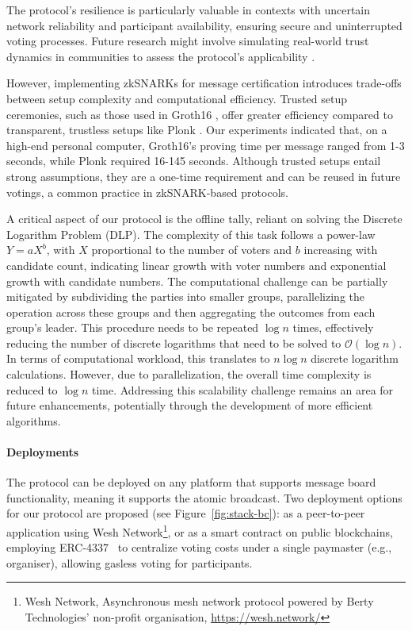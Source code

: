 \documentclass[runningheads]{llncs}
\begin{document}
The protocol's resilience is particularly valuable in contexts with uncertain network reliability and participant availability, ensuring secure and uninterrupted voting processes. Future research might involve simulating real-world trust dynamics in communities to assess the protocol's applicability \cite{healdMathematicalDescriptionTrust2019}.

However, implementing zkSNARKs for message certification introduces trade-offs between setup complexity and computational efficiency. Trusted setup ceremonies, such as those used in Groth16 \cite{grothSizePairingbasedNoninteractive2016}, offer greater efficiency compared to transparent, trustless setups like Plonk \cite{gabizonPlonkPermutationsLagrangebases2019a}. Our experiments indicated that, on a high-end personal computer, Groth16's proving time per message ranged from 1-3 seconds, while Plonk required 16-145 seconds. Although trusted setups entail strong assumptions, they are a one-time requirement and can be reused in future votings, a common practice in zkSNARK-based protocols.

A critical aspect of our protocol is the offline tally, reliant on solving the Discrete Logarithm Problem (DLP). The complexity of this task follows a power-law \( Y = aX^b \), with \( X \) proportional to the number of voters and \( b \) increasing with candidate count, indicating linear growth with voter numbers and exponential growth with candidate numbers. The computational challenge can be partially mitigated by subdividing the parties into smaller groups, parallelizing the operation across these groups and then aggregating the outcomes from each group's leader. This procedure needs to be repeated $\log{n}$ times, effectively reducing the number of discrete logarithms that need to be solved to $\mathcal{O}(\log{n})$. In terms of computational workload, this translates to $n\log{n}$ discrete logarithm calculations. However, due to parallelization, the overall time complexity is reduced to $\log{n}$ time. Addressing this scalability challenge remains an area for future enhancements, potentially through the development of more efficient algorithms.

\paragraph{Deployments}
The protocol can be deployed on any platform that supports message board functionality, meaning it supports the atomic broadcast. 
Two deployment options for our protocol are proposed (see Figure~\ref{fig:stack-bc}): as a peer-to-peer application using Wesh Network\footnote{Wesh Network, Asynchronous mesh network protocol powered by Berty Technologies’ non-profit organisation, \url{https://wesh.network/}}, or as a smart contract on public blockchains, employing ERC-4337~\cite{ERC4337AccountAbstraction} to centralize voting costs under a single paymaster (e.g., organiser), allowing gasless voting for participants.
\end{document}
